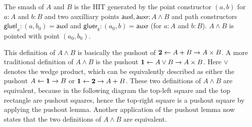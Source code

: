 \documentclass{article}
\renewcommand{\smash}{\wedge}
\newcommand{\auxl}{\mathsf{auxl}}
\newcommand{\auxr}{\mathsf{auxr}}
\newcommand{\gluel}{\mathsf{gluel}}
\newcommand{\gluer}{\mathsf{gluer}}
\begin{document}
\begin{defn}
  The smash of $A$ and $B$ is the HIT generated by the point constructor $(a,b)$ for $a:A$ and $b:B$
  and two auxilliary points $\auxl,\auxr:A\smash B$ and path constructors $\gluel_a:(a,b_0)=\auxl$
  and $\gluer_b:(a_0,b)=\auxr$ (for $a:A$ and $b:B$). $A\smash B$ is pointed with point $(a_0,b_0)$.
\end{defn}
\begin{rmk}
\item This definition of $A\smash B$ is basically the pushout of
  $\mathbf{2}\leftarrow A+B\to A \times B$.  A more traditional definition of $A\smash B$ is the pushout
  $\mathbf{1}\leftarrow A\vee B\to A \times B$. Here $\vee$ denotes the wedge product, which can be
  equivalently described as either the pushout $A\leftarrow \mathbf{1}\to B$ or
  $\mathbf{1}\leftarrow \mathbf{2}\to A + B$. These two definitions of $A\smash B$ are equivalent, because in
  the following diagram the top-left square and the top rectangle are pushout squares, hence the
  top-right square is a pushout square by applying the pushout lemma. Another application of the
  pushout lemma now states that the two definitions of $A\smash B$ are equivalent.
\begin{center}
\end{center}

\end{rmk}
\end{document}
